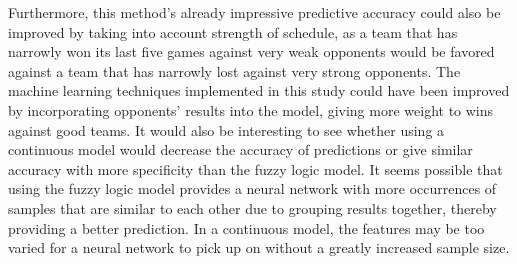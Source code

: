 \documentclass[sigconf]{acmart}
\begin{document}
Furthermore, this method's already impressive predictive accuracy could also be improved by taking into account strength of schedule, as a team that has narrowly won its last five games against very weak opponents would be favored against a team that has narrowly lost against very strong opponents. The machine learning techniques implemented in this study could have been improved by incorporating opponents' results into the model, giving more weight to wins against good teams. \cite{paper2} It would also be interesting to see whether using a continuous model would decrease the accuracy of predictions or give similar accuracy with more specificity than the fuzzy logic model. It seems possible that using the fuzzy logic model provides a neural network with more occurrences of samples that are similar to each other due to grouping results together, thereby providing a better prediction. In a continuous model, the features may be too varied for a neural network to pick up on without a greatly increased sample size.
\end{document}
